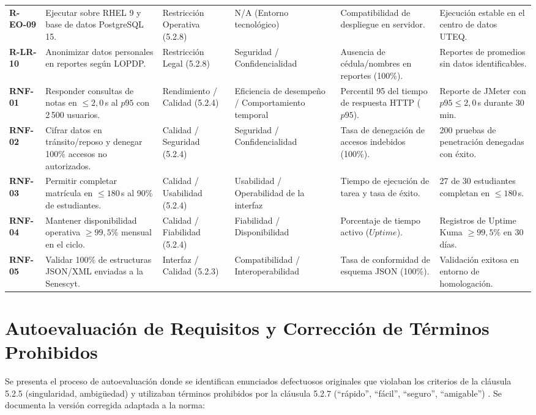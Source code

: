 \documentclass[conference]{IEEEtran}
\begin{document}
{\begin{tabularx}{\textwidth}{@{}p{0.8cm} Y p{2.1cm} p{2.5cm} p{2.0cm} p{2.1cm}@{}}
			\addlinespace
			\textbf{R-EO-09} & Ejecutar sobre RHEL 9 y base de datos PostgreSQL 15. & Restricción Operativa (5.2.8) & N/A (Entorno tecnológico) & Compatibilidad de despliegue en servidor. & Ejecución estable en el centro de datos UTEQ.\\
			\addlinespace
			\textbf{R-LR-10} & Anonimizar datos personales en reportes según LOPDP. & Restricción Legal (5.2.8) & Seguridad / Confidencialidad & Ausencia de cédula/nombres en reportes (100\%). & Reportes de promedios sin datos identificables.\\
			\addlinespace
			\textbf{RNF-01} & Responder consultas de notas en $\le 2{,}0$\,s al $p95$ con 2\,500 usuarios. & Rendimiento / Calidad (5.2.4) & Eficiencia de desempeño / Comportamiento temporal & Percentil 95 del tiempo de respuesta HTTP ($p95$). & Reporte de JMeter con $p95 \le 2{,}0$\,s durante 30 min.\\
			\addlinespace
			\textbf{RNF-02} & Cifrar datos en tránsito/reposo y denegar 100\% accesos no autorizados. & Calidad / Seguridad (5.2.4) & Seguridad / Confidencialidad & Tasa de denegación de accesos indebidos (100\%). & 200 pruebas de penetración denegadas con éxito.\\
			\addlinespace
			\textbf{RNF-03} & Permitir completar matrícula en $\le 180$\,s al 90\% de estudiantes. & Calidad / Usabilidad (5.2.4) & Usabilidad / Operabilidad de la interfaz & Tiempo de ejecución de tarea y tasa de éxito. & 27 de 30 estudiantes completan en $\le 180$\,s.\\
			\addlinespace
			\textbf{RNF-04} & Mantener disponibilidad operativa $\ge 99{,}5\%$ mensual en el ciclo. & Calidad / Fiabilidad (5.2.4) & Fiabilidad / Disponibilidad & Porcentaje de tiempo activo ($Uptime$). & Registros de Uptime Kuma $\ge 99{,}5\%$ en 30 días.\\
			\addlinespace
			\textbf{RNF-05} & Validar 100\% de estructuras JSON/XML enviadas a la Senescyt. & Interfaz / Calidad (5.2.3) & Compatibilidad / Interoperabilidad & Tasa de conformidad de esquema JSON (100\%). & Validación exitosa en entorno de homologación.\\
			\bottomrule
		\end{tabularx}\par}
	\vspace{0.2cm}
	
	\section{Autoevaluación de Requisitos y Corrección de Términos Prohibidos}
	Se presenta el proceso de autoevaluación donde se identifican enunciados defectuosos originales que violaban los criterios de la cláusula 5.2.5 (singularidad, ambigüedad) y utilizaban términos prohibidos por la cláusula 5.2.7 (``rápido'', ``fácil'', ``seguro'', ``amigable'') \cite{ieee29148}. Se documenta la versión corregida adaptada a la norma:
	
\end{document}
